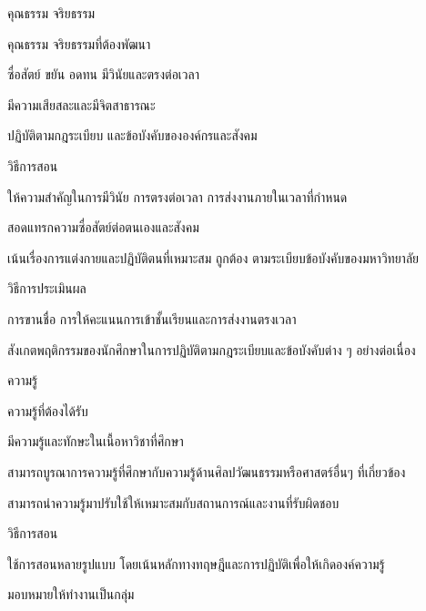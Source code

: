 \begin{edudev}
\item คุณธรรม จริยธรรม
		\begin{enumdev}
		\item คุณธรรม จริยธรรมที่ต้องพัฒนา
				\begin{subenumdev}
				\item \withbc ซื่อสัตย์ ขยัน อดทน มีวินัยและตรงต่อเวลา
				\item \withwc มีความเสียสละและมีจิตสาธารณะ
				\item \withwc ปฏิบัติตามกฎระเบียบ และข้อบังคับขององค์กรและสังคม
				\end{subenumdev}
		\item วิธีการสอน
				\begin{subenumdev}
				\item ให้ความสำคัญในการมีวินัย การตรงต่อเวลา การส่งงานภายในเวลาที่กำหนด
				\item สอดแทรกความซื่อสัตย์ต่อตนเองและสังคม
				\item เน้นเรื่องการแต่งกายและปฏิบัติตนที่เหมาะสม ถูกต้อง ตามระเบียบข้อบังคับของมหาวิทยาลัย
			\end{subenumdev}
		\item วิธีการประเมินผล
				\begin{subenumdev}
				\item การขานชื่อ การให้คะแนนการเข้าชั้นเรียนและการส่งงานตรงเวลา
				\item สังเกตพฤติกรรมของนักศึกษาในการปฏิบัติตามกฎระเบียบและข้อบังคับต่าง ๆ อย่างต่อเนื่อง
			\end{subenumdev}
		\end{enumdev}
\item ความรู้
		\begin{enumdev}
		\item ความรู้ที่ต้องได้รับ
				\begin{subenumdev}
				\item \withbc มีความรู้และทักษะในเนื้อหาวิชาที่ศึกษา
				\item \withwc สามารถบูรณาการความรู้ที่ศึกษากับความรู้ด้านศิลปวัฒนธรรมหรือศาสตร์อื่นๆ ที่เกี่ยวข้อง
				\item \withwc สามารถนำความรู้มาปรับใช้ให้เหมาะสมกับสถานการณ์และงานที่รับผิดชอบ
				\end{subenumdev}
		\item วิธีการสอน
				\begin{subenumdev}
				\item ใช้การสอนหลายรูปแบบ โดยเน้นหลักทางทฤษฎีและการปฏิบัติเพื่อให้เกิดองค์ความรู้
				\item มอบหมายให้ทำงานเป็นกลุ่ม

\end{subenumdev}
\end{enumdev}
\end{edudev}
